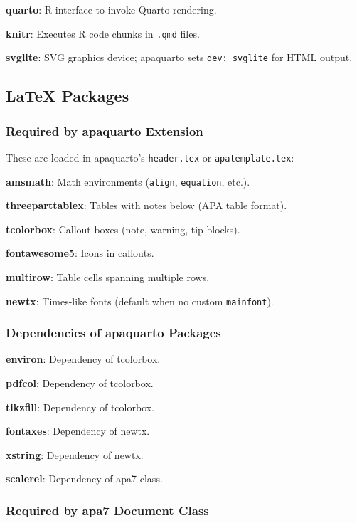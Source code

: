 \documentclass[
  man,
  longtable,
  nolmodern,
  notxfonts,
  notimes,
  colorlinks=true,linkcolor=blue,citecolor=blue,urlcolor=blue]{apa7}
\begin{document}
\textbf{quarto}: R interface to invoke Quarto rendering.

\textbf{knitr}: Executes R code chunks in \texttt{.qmd} files.

\textbf{svglite}: SVG graphics device; apaquarto sets
\texttt{dev:\ svglite} for HTML output.

\subsection{LaTeX Packages}\label{latex-packages}

\subsubsection{Required by apaquarto
Extension}\label{required-by-apaquarto-extension}

These are loaded in apaquarto's \texttt{header.tex} or
\texttt{apatemplate.tex}:

\textbf{amsmath}: Math environments (\texttt{align}, \texttt{equation},
etc.).

\textbf{threeparttablex}: Tables with notes below (APA table format).

\textbf{tcolorbox}: Callout boxes (note, warning, tip blocks).

\textbf{fontawesome5}: Icons in callouts.

\textbf{multirow}: Table cells spanning multiple rows.

\textbf{newtx}: Times-like fonts (default when no custom
\texttt{mainfont}).

\subsubsection{Dependencies of apaquarto
Packages}\label{dependencies-of-apaquarto-packages}

\textbf{environ}: Dependency of tcolorbox.

\textbf{pdfcol}: Dependency of tcolorbox.

\textbf{tikzfill}: Dependency of tcolorbox.

\textbf{fontaxes}: Dependency of newtx.

\textbf{xstring}: Dependency of newtx.

\textbf{scalerel}: Dependency of apa7 class.

\subsubsection{Required by apa7 Document
Class}\label{required-by-apa7-document-class}
\end{document}
